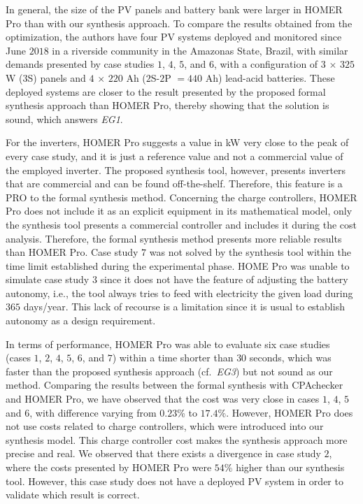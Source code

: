 \documentclass[runningheads]{llncs}
\begin{document}
In general, the size of the PV panels and battery bank were larger in HOMER Pro than with our synthesis approach. To compare the results obtained from the optimization, the authors have four PV systems deployed and monitored since June $2018$ in a riverside community in the Amazonas State, Brazil, with similar demands presented by case studies $1$, $4$, $5$, and $6$, with a configuration of $3$ $\times$ $325$ W ($3$S) panels and $4$ $\times$ $220$ Ah ($2$S-$2$P $= 440$ Ah) lead-acid batteries. These deployed systems are closer to the result presented by the proposed formal synthesis approach than HOMER Pro, thereby showing that the solution is sound, which answers \textit{EG1}.

For the inverters, HOMER Pro suggests a value in kW very close to the peak of every case study, and it is just a reference value and not a commercial value of the employed inverter. The proposed synthesis tool, however, presents inverters that are commercial and can be found off-the-shelf. Therefore, this feature is a PRO to the formal synthesis method. Concerning the charge controllers, HOMER Pro does not include it as an explicit equipment in its mathematical model, only the synthesis tool presents a commercial controller and includes it during the cost analysis. Therefore, the formal synthesis method presents more reliable results than HOMER Pro. Case study $7$ was not solved by the synthesis tool within the time limit established during the experimental phase. HOME Pro was unable to simulate case study $3$ since it does not have the feature of adjusting the battery autonomy, i.e., the tool always tries to feed with electricity the given load during $365$ days/year. This lack of recourse is a limitation since it is usual to establish autonomy as a design requirement.

In terms of performance, HOMER Pro was able to evaluate six case studies (cases $1$, $2$, $4$, $5$, $6$, and $7$) within a time shorter than $30$ seconds, which was faster than the proposed synthesis approach (cf.~\textit{EG3}) but not sound as our method.  
Comparing the results between the formal synthesis with CPAchecker and HOMER Pro, we have observed that the cost was very close in cases $1$, $4$, $5$ and $6$, with difference varying from $0.23$\% to $17.4$\%. However, HOMER Pro does not use costs related to charge controllers, which were introduced into our synthesis model. This charge controller cost makes the synthesis approach more precise and real. We observed that there exists a divergence in case study $2$, where the costs presented by HOMER Pro were $54$\% higher than our synthesis tool. However, this case study does not have a deployed PV system in order to validate which result is correct.
\end{document}
